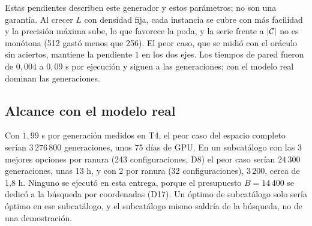 Estas pendientes describen este generador y estos parámetros; no son una garantía. Al crecer
$L$ con densidad fija, cada instancia se cubre con más facilidad y la precisión máxima sube,
lo que favorece la poda, y la serie frente a $|\mathcal{C}|$ no es monótona (512 gastó menos que
256). El peor caso, que se midió con el oráculo sin aciertos, mantiene la pendiente $1$ en
los dos ejes. Los tiempos de pared fueron de $0{,}004$ a $0{,}09$ s por ejecución y siguen a
las generaciones; con el modelo real dominan las generaciones.

\subsection{Alcance con el modelo real}

Con $1{,}99$ s por generación medidos en T4, el peor caso del espacio completo serían
$3\,276\,800$ generaciones, unos 75 días de GPU. En un subcatálogo con las 3 mejores opciones
por ranura (243 configuraciones, D8) el peor caso serían $24\,300$ generaciones, unas 13 h, y
con 2 por ranura (32 configuraciones), $3\,200$, cerca de 1,8 h. Ninguno se ejecutó en esta
entrega, porque el presupuesto $B=14\,400$ se dedicó a la búsqueda por coordenadas (D17). Un
óptimo de subcatálogo solo sería óptimo en ese subcatálogo, y el subcatálogo mismo saldría de
la búsqueda, no de una demostración.
